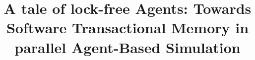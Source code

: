 \documentclass{bmcart}
\begin{document}

\begin{frontmatter}

\begin{fmbox}


\title{A tale of lock-free Agents: Towards Software Transactional Memory in parallel Agent-Based Simulation}


\author[
   addressref={aff1},                   %
   corref={aff1},                       %
   email={jonathan.thaler@nottingham.ac.uk}   %
]{ }
\author[
   addressref={aff1},
   email={peer-olaf.siebers@nottingham.ac.uk}
]{ }


\address[id=aff1]{%
  , %
  ,                     %
  ,                              %
}


\end{fmbox}
\end{frontmatter}
\end{document}
